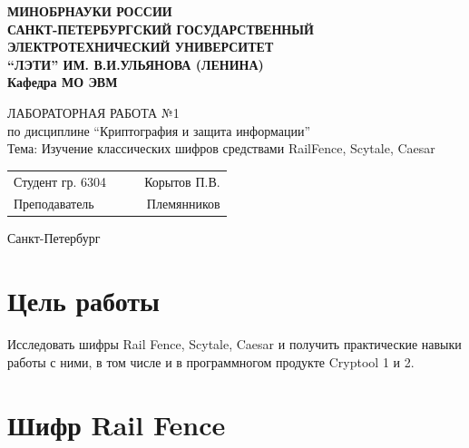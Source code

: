 \documentclass[a4paper, 14pt]{extarticle}
\begin{document}
\begin{titlepage}
    \centering
    {\bfseries
        \uppercase{
            Минобрнауки России \\
            Санкт-Петербургский государственный \\
            Электротехнический университет \\
            \enquote{ЛЭТИ} им. В.И.Ульянова (Ленина)\\
        }
        Кафедра МО ЭВМ

        \vspace{\fill}
        \uppercase{Лабораторная работа №1} \\
        по дисциплине \enquote{Криптография и защита информации} \\
        Тема: Изучение классических шифров средствами RailFence, Scytale, Caesar
    }

    \vspace{\fill}
    \begin{tabularx}{0.8\textwidth}{l X c r}
        Студент гр. 6304 & & \underline{\hspace{3cm}} & Корытов П.В.\\
        Преподаватель & & \underline{\hspace{3cm}} & Племянников
    \end{tabularx}

    \vspace{1cm}
    Санкт-Петербург \\
    \the\year{}
\end{titlepage}

\newpage

\section*{Цель работы}
Исследовать шифры Rail Fence, Scytale, Caesar и получить практические навыки работы с ними, в том числе и в программногом продукте Cryptool 1 и 2.

\section{Шифр Rail Fence}
\end{document}
